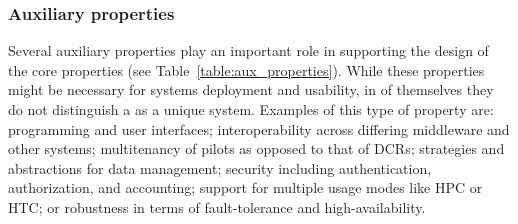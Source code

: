 \documentclass{sig-alternate}
\begin{document}
\begin{itemize}

\end{itemize}

\subsubsection{Auxiliary properties}
\label{sec:auxprops}

Several auxiliary properties play an important role in supporting the design of
the core properties (see Table~\ref{table:aux_properties}). While these
properties might be necessary for \pilot systems deployment and usability, in of
themselves they do not distinguish a \pilot as a unique system. Examples of this
type of property are: programming and user interfaces; interoperability across
differing middleware and other \pilot systems; multitenancy of pilots as opposed
to that of DCRs; strategies and abstractions for data management; security
including authentication, authorization, and accounting; support for multiple
usage modes like HPC or HTC; or robustness in terms of fault-tolerance and
high-availability.
\end{document}
